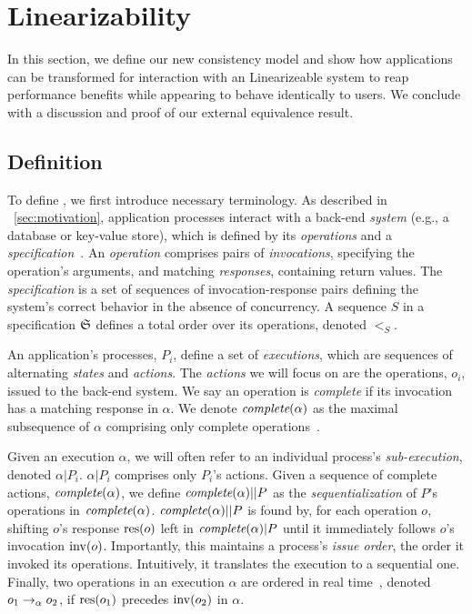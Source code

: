 \section{\Multidispatch{} Linearizability}
\label{sec:mdl}

In this section, we define our new consistency model and show how
applications can be transformed for interaction with an \multidispatch{} Linearizeable system to reap performance benefits while appearing to behave identically to users. We conclude with a discussion and proof of our external equivalence result.



\subsection{Definition}
\label{sec:mdl:def}


To define \mdl{}, we first introduce necessary terminology. As described in ~\ref{sec:motivation}, application processes interact with a back-end \textit{system} (e.g., a database or key-value store),
which is defined by its \textit{operations} and a
\textit{specification}~\cite{herlihy1990linearizability,lynch1996da}. An
\textit{operation} comprises pairs of \textit{invocations}, specifying the
operation's arguments, and matching \textit{responses}, containing
return values. The \textit{specification} is a
set of sequences of
invocation-response pairs defining the system's correct behavior in the absence
of concurrency. A sequence $S$ in a specification $\mathfrak{S}$ defines a total order
over its operations, denoted $<_S$.

An application's processes, $P_i$, define a set of \textit{executions},
which are sequences of alternating \textit{states} and
\textit{actions}. The \textit{actions} we will focus on are the operations, $o_i$, issued to the back-end system.
We say an
operation is \textit{complete} if its invocation has a matching response in
$\alpha$. We denote $\operatorname*{\textit{complete}}(\alpha)$ as the maximal subsequence of $\alpha$
comprising only complete operations~\cite{herlihy1990linearizability}. 

Given an execution $\alpha$, we will often refer to an individual process's
\textit{sub-execution}, denoted $\alpha|P_i$. $\alpha|P_i$ comprises
only $P_i$'s actions. Given a sequence of complete actions,
$\operatorname*{\textit{complete}}(\alpha)$, we define $\operatorname*{\textit{complete}}(\alpha)||P$ as the
\textit{sequentialization} of $P$'s operations in $\operatorname*{\textit{complete}}(\alpha)$.
$\operatorname*{\textit{complete}}(\alpha)||P$ is found by, for each operation $o$, shifting $o$'s response
$\operatorname{res}(o)$ left in $\operatorname*{\textit{complete}}(\alpha)|P$ until it immediately follows $o$'s
invocation $\operatorname{inv}(o)$.
Importantly, this maintains a process's
\textit{issue order}, the order it invoked its operations. Intuitively, it translates the execution to a sequential one.
Finally, two operations in an execution $\alpha$ are
ordered in real time~\cite{herlihy1990linearizability}, denoted
$o_1 \rightarrow_\alpha o_2$, if $\operatorname{res}(o_1)$ precedes $\operatorname{inv}(o_2)$ in $\alpha$.

